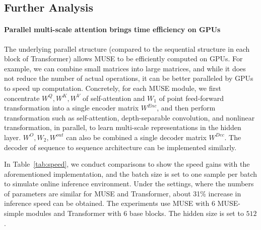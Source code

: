 \documentclass{article} %
\begin{document}
\subsection{Further Analysis}

\paragraph{Parallel multi-scale attention brings time efficiency on GPUs}

The underlying parallel structure (compared to the sequential structure in each block of Transformer) allows MUSE to be efficiently computed on GPUs. For example, we can combine small matrices into large matrices, and while it does not reduce the number of actual operations, it can be better paralleled by GPUs to speed up computation.  Concretely, for each MUSE module,  we  first concentrate $W^Q,W^K,W^V$ of self-attention and $W_1$ of point feed-forward transformation into a single encoder matrix $W^{Enc}$, and then perform transformation such as self-attention, depth-separable convolution, and nonlinear transformation, in parallel, to learn multi-scale representations in the hidden layer. $W^O,W_2,W^{out}$ can also be combined a single decoder matrix  $W^{Dec}$. The decoder of sequence to sequence architecture can be implemented similarly.

In Table~\ref{tab:speed}, we conduct comparisons to show the speed gains with the aforementioned implementation, and the batch size is set to one sample per batch to simulate online inference environment. Under the settings, where the numbers of parameters are similar for MUSE and Transformer, about 31\% increase in inference speed can be obtained. The experiments use MUSE with $6$ MUSE-simple modules and Transformer with $6$ base blocks. The hidden size is set to $512$. %

\end{document}
